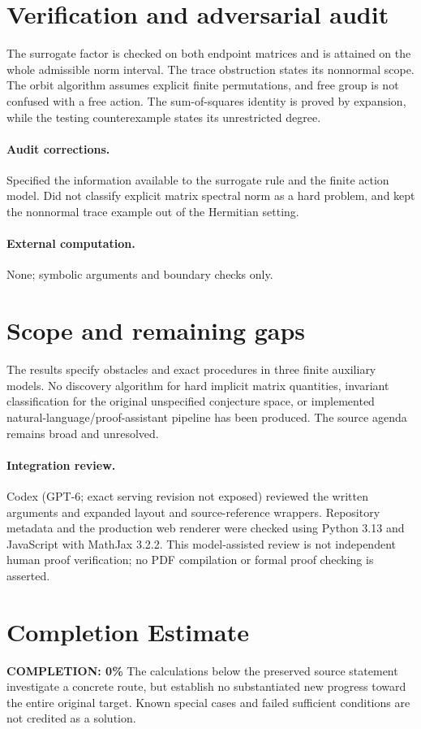 \documentclass[11pt]{article}
\begin{document}
\section{Verification and adversarial audit}

The surrogate factor is checked on both endpoint matrices and is attained on
the whole admissible norm interval. The trace obstruction states its nonnormal
scope. The orbit algorithm assumes explicit finite permutations, and free group
is not confused with a free action. The sum-of-squares identity is proved by
expansion, while the testing counterexample states its unrestricted degree.

\paragraph{Audit corrections.} Specified the information available to the surrogate rule and the finite
action model. Did not classify explicit matrix spectral norm as a hard problem,
and kept the nonnormal trace example out of the Hermitian setting.
\paragraph{External computation.} None; symbolic arguments and boundary checks only.
\section{Scope and remaining gaps}

The results specify obstacles and exact procedures in three finite auxiliary
models. No discovery algorithm for hard implicit matrix quantities, invariant
classification for the original unspecified conjecture space, or implemented
natural-language/proof-assistant pipeline has been produced. The source agenda
remains broad and unresolved.

\paragraph{Integration review.} Codex (GPT-6; exact serving revision not exposed) reviewed the written arguments and expanded layout and source-reference wrappers. Repository metadata and the production web renderer were checked using Python 3.13 and JavaScript with MathJax 3.2.2. This model-assisted review is not independent human proof verification; no PDF compilation or formal proof checking is asserted.

\section{Completion Estimate}
\noindent\textbf{COMPLETION: 0\%}
The calculations below the preserved source statement investigate a concrete route,
but establish no substantiated new progress toward the entire original target.
Known special cases and failed sufficient conditions are not credited as a solution.
\end{document}
